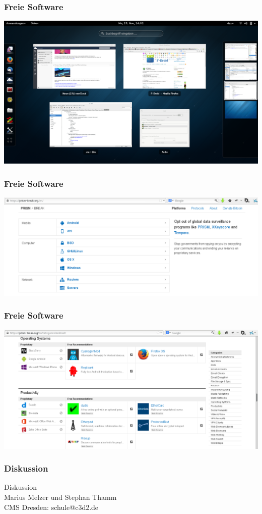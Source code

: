 \documentclass[12pt]{beamer}
\begin{document}
\begin{frame}
    \frametitle{Freie Software}
    \includegraphics[height=0.7\textheight]{img/gnome.png}
\end{frame}

\begin{frame}
    \frametitle{Freie Software}
    \includegraphics[height=0.7\textheight]{img/prism-break1.png}
\end{frame}

\begin{frame}
    \frametitle{Freie Software}
    \includegraphics[height=0.7\textheight]{img/prism-break2.png}
\end{frame}

\begin{frame}
    \frametitle{Diskussion}
    \begin{center} {\Large Diskussion}\\Marius Melzer und Stephan Thamm\\CMS Dresden: schule@c3d2.de \end{center}
\end{frame}
\end{document}
